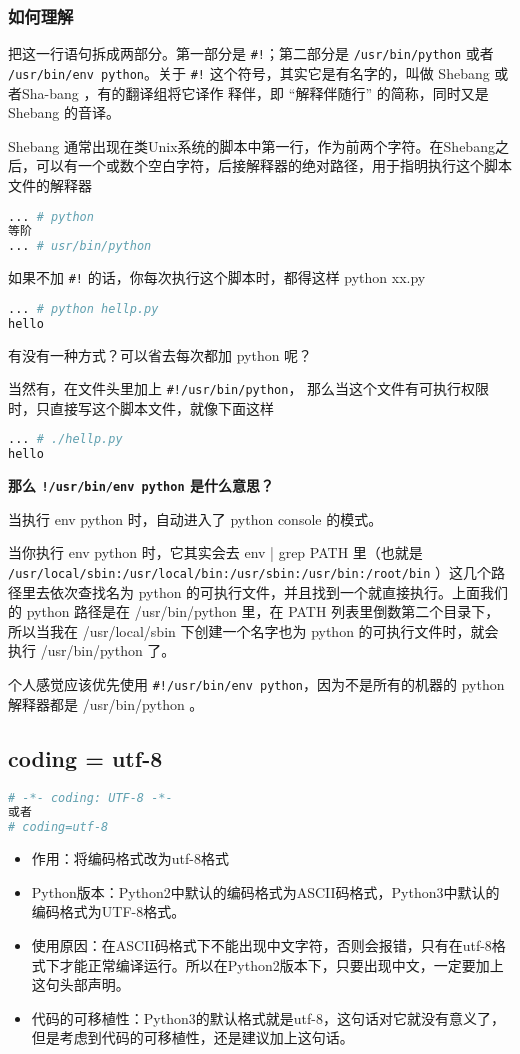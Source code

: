 \subsubsection{如何理解}
把这一行语句拆成两部分。第一部分是 \verb|#!|；第二部分是 \verb|/usr/bin/python| 或者 \verb|/usr/bin/env python|。关于 \verb|#!| 这个符号，其实它是有名字的，叫做 Shebang 或者Sha-bang ，有的翻译组将它译作 释伴，即 “解释伴随行” 的简称，同时又是 Shebang 的音译。

Shebang 通常出现在类Unix系统的脚本中第一行，作为前两个字符。在Shebang之后，可以有一个或数个空白字符，后接解释器的绝对路径，用于指明执行这个脚本文件的解释器
\begin{lstlisting}[language=bash]
... # python
等阶
... # usr/bin/python
\end{lstlisting}

如果不加 \verb|#!| 的话，你每次执行这个脚本时，都得这样 python xx.py
\begin{lstlisting}[language=bash]
... # python hellp.py
hello
\end{lstlisting}

有没有一种方式？可以省去每次都加 python 呢？

当然有，在文件头里加上 \verb|#!/usr/bin/python|， 那么当这个文件有可执行权限 时，只直接写这个脚本文件，就像下面这样
\begin{lstlisting}[language=bash]
... # ./hellp.py
hello
\end{lstlisting}

\textbf{那么 \verb|!/usr/bin/env python| 是什么意思？}

当执行 env python 时，自动进入了 python console 的模式。

当你执行 env python 时，它其实会去 env | grep PATH 里（也就是\verb| /usr/local/sbin:/usr/local/bin:/usr/sbin:/usr/bin:/root/bin| ）这几个路径里去依次查找名为 python 的可执行文件，并且找到一个就直接执行。上面我们的 python 路径是在 /usr/bin/python 里，在 PATH 列表里倒数第二个目录下，所以当我在 /usr/local/sbin 下创建一个名字也为 python 的可执行文件时，就会执行 /usr/bin/python 了。

个人感觉应该优先使用 \verb|#!/usr/bin/env python|，因为不是所有的机器的 python 解释器都是 /usr/bin/python 。

\subsection{coding = utf-8 }
\begin{lstlisting}[language=python]
# -*- coding: UTF-8 -*-
或者
# coding=utf-8
\end{lstlisting}
\begin{itemize}
\item 作用：将编码格式改为utf-8格式
\item Python版本：Python2中默认的编码格式为ASCII码格式，Python3中默认的编码格式为UTF-8格式。
\item 使用原因：在ASCII码格式下不能出现中文字符，否则会报错，只有在utf-8格式下才能正常编译运行。所以在Python2版本下，只要出现中文，一定要加上这句头部声明。
\item 代码的可移植性：Python3的默认格式就是utf-8，这句话对它就没有意义了，但是考虑到代码的可移植性，还是建议加上这句话。
\end{itemize}

